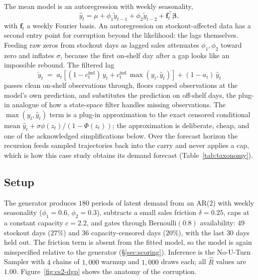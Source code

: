 The mean model is an autoregression with weekly seasonality,
\begin{equation}\label{eq:cs2-mean}
\hat{y}_t = \mu + \phi_1 \tilde{y}_{t-1} + \phi_2 \tilde{y}_{t-2} + \mathbf{f}_t^{\top} \boldsymbol{\beta},
\end{equation}
with $\mathbf{f}_t$ a weekly Fourier basis. An autoregression on stockout-affected data has a second entry point for corruption beyond the likelihood: the lags themselves. Feeding raw zeros from stockout days as lagged sales attenuates $\phi_1, \phi_2$ toward zero and inflates $\sigma$, because the first on-shelf day after a gap looks like an impossible rebound. The filtered lag
\begin{equation}\label{eq:lag-filter}
\tilde{y}_t \;=\; a_t \left[ (1 - c^{\text{ind}}_t) \, y_t + c^{\text{ind}}_t \, \max(y_t, \hat{y}_t) \right] + (1 - a_t) \, \hat{y}_t
\end{equation}
passes clean on-shelf observations through, floors capped observations at the model's own prediction, and substitutes the prediction on off-shelf days, the plug-in analogue of how a state-space filter handles missing observations. The $\max(y_t, \hat{y}_t)$ term is a plug-in approximation to the exact censored conditional mean $\hat{y}_t + \sigma \phi(z_t) / (1 - \Phi(z_t))$; the approximation is deliberate, cheap, and one of the acknowledged simplifications below. Over the forecast horizon the recursion feeds sampled trajectories back into the carry and never applies a cap, which is how this case study obtains its demand forecast (Table~\ref{tab:taxonomy}).

\subsection{Setup}\label{sec:cs2-setup}

The generator produces $180$ periods of latent demand from an AR(2) with weekly seasonality ($\phi_1 = 0.6$, $\phi_2 = 0.3$), subtracts a small sales friction $\delta = 0.25$, caps at a constant capacity $c = 2.2$, and gates through $\text{Bernoulli}(0.8)$ availability: $49$ stockout days ($27\%$) and $36$ capacity-censored days ($20\%$), with the last $30$ days held out. The friction term is absent from the fitted model, so the model is again misspecified relative to the generator (\S\ref{sec:scoring}). Inference is the No-U-Turn Sampler with $4$ chains of $1{,}000$ warmup and $1{,}000$ draws each; all $\hat{R}$ values are $1.00$. Figure~\ref{fig:cs2-dgp} shows the anatomy of the corruption.

